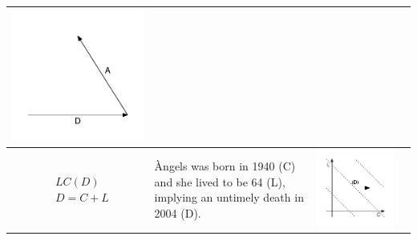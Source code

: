 \documentclass[11pt,oneside,a4paper]{article} %
\begin{document}
\begin{center}
\begin{longtable}{m{}m{}m{}m{}}
  \includegraphics[width = \linewidth]{Figures/JonasTable/AD_iso.pdf}  \\
  \midrule
  $$\begin{aligned}
    &LC(D) \\
    &D = C + L
  \end{aligned}$$ &
  {\`A}ngels was born in 1940 (C) and she lived to be 64 (L), implying an
  untimely death in 2004 (D).
  & \includegraphics[width = \linewidth]{Figures/JonasTable/LCd.pdf} &

\end{longtable}
\end{center}
\end{document}
